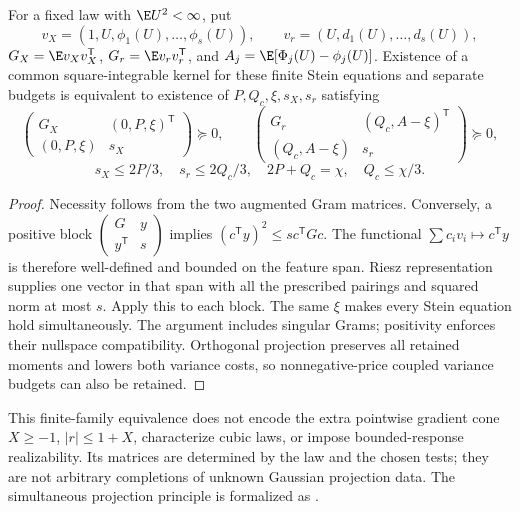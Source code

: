 \begin{proposition}
For a fixed law with $\E U^2<\infty$, put
\[
 v_X=(1,U,\phi_1(U),\ldots,\phi_s(U)),\qquad
 v_r=(U,d_1(U),\ldots,d_s(U)),
\]
$G_X=\E v_Xv_X^{\mathsf T}$, $G_r=\E v_rv_r^{\mathsf T}$, and
$A_j=\E[\Phi_j(U)-\phi_j(U)]$. Existence of a common square-integrable
kernel for these finite Stein equations and separate budgets is equivalent to
existence of $P,Q_c,\xi,s_X,s_r$ satisfying
\[
 \begin{pmatrix}G_X&(0,P,\xi)^{\mathsf T}\\(0,P,\xi)&s_X\end{pmatrix}\succeq0,
 \qquad
 \begin{pmatrix}G_r&(Q_c,A-\xi)^{\mathsf T}\\(Q_c,A-\xi)&s_r\end{pmatrix}\succeq0,
\]
\[
 s_X\le2P/3,\quad s_r\le2Q_c/3,\quad
 2P+Q_c=\chi,\quad Q_c\le\chi/3.
\]
\end{proposition}
\begin{proof}
Necessity follows from the two augmented Gram matrices. Conversely, a positive
block $\left(\begin{smallmatrix}G&y\\y^{\mathsf T}&s\end{smallmatrix}\right)$
implies $(c^{\mathsf T}y)^2\le s c^{\mathsf T}Gc$. The functional
$\sum c_i v_i\mapsto c^{\mathsf T}y$ is therefore well-defined and bounded
on the feature span. Riesz representation supplies one vector in that span
with all the prescribed pairings and squared norm at most $s$. Apply this to
each block. The same $\xi$ makes every Stein equation hold simultaneously.
The argument includes singular Grams; positivity enforces their nullspace
compatibility. Orthogonal projection preserves all retained moments and lowers
both variance costs, so nonnegative-price coupled variance budgets can also be
retained.
\end{proof}

This finite-family equivalence does not encode the extra pointwise gradient
cone $X\ge-1$, $|r|\le1+X$, characterize cubic laws, or impose bounded-response
realizability. Its matrices are determined by the law and the chosen tests;
they are not arbitrary completions of unknown Gaussian projection data.
The simultaneous projection principle is formalized as
.

